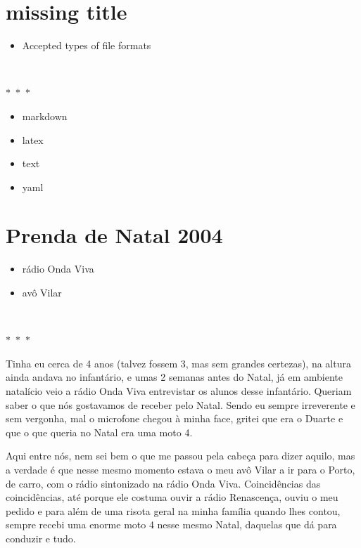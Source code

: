 \documentclass{article}
\begin{document}
    	
\pagebreak\section{missing title}
\begin{itemize}\item Accepted types of file formats
\end{itemize}
\  
    \begin{center}
        $\ast$~$\ast$~$\ast$
    \end{center}
    \begin{itemize}
\tightlist
\item
  markdown
\item
  latex
\item
  text
\item
  yaml
\end{itemize}

    	
\pagebreak\section{Prenda de Natal 2004}
\begin{itemize}\item rádio Onda Viva
\item avô Vilar
\end{itemize}
\  
    \begin{center}
        $\ast$~$\ast$~$\ast$
    \end{center}
    Tinha eu cerca de 4 anos (talvez fossem 3, mas sem grandes certezas), na
altura ainda andava no infantário, e umas 2 semanas antes do Natal, já
em ambiente natalício veio a rádio Onda Viva entrevistar os alunos desse
infantário. Queriam saber o que nós gostavamos de receber pelo Natal.
Sendo eu sempre irreverente e sem vergonha, mal o microfone chegou à
minha face, gritei que era o Duarte e que o que queria no Natal era uma
moto 4.

Aqui entre nós, nem sei bem o que me passou pela cabeça para dizer
aquilo, mas a verdade é que nesse mesmo momento estava o meu avô Vilar a
ir para o Porto, de carro, com o rádio sintonizado na rádio Onda Viva.
Coincidências das coincidências, até porque ele costuma ouvir a rádio
Renascença, ouviu o meu pedido e para além de uma risota geral na minha
família quando lhes contou, sempre recebi uma enorme moto 4 nesse mesmo
Natal, daquelas que dá para conduzir e tudo.

    	
\pagebreak
\end{document}

